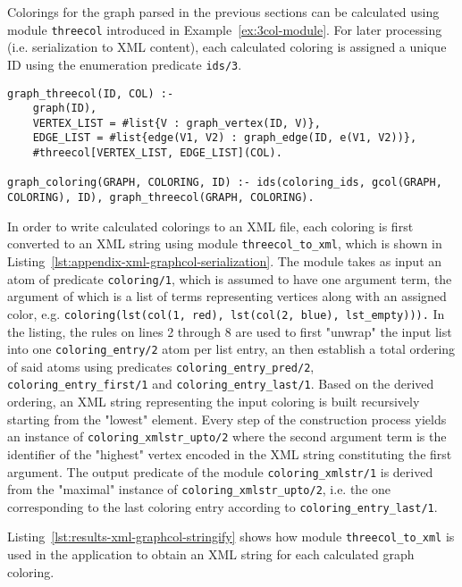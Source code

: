 Colorings for the graph parsed in the previous sections can be calculated using module \texttt{threecol} introduced in Example~\ref{ex:3col-module}. For later processing (i.e. serialization to XML content), each calculated coloring is assigned a unique ID using the enumeration predicate \texttt{ids/3}.

\begin{lstlisting}[style=asp-code, label={lst:results-xml-graphcol-colorings}, caption={Calculating graph colorings.}]
graph_threecol(ID, COL) :- 
	graph(ID), 
	VERTEX_LIST = #list{V : graph_vertex(ID, V)}, 
	EDGE_LIST = #list{edge(V1, V2) : graph_edge(ID, e(V1, V2))}, 
	#threecol[VERTEX_LIST, EDGE_LIST](COL).

graph_coloring(GRAPH, COLORING, ID) :- ids(coloring_ids, gcol(GRAPH, COLORING), ID), graph_threecol(GRAPH, COLORING).    
\end{lstlisting}    

In order to write calculated colorings to an XML file, each coloring is first converted to an XML string using module \texttt{threecol\_to\_xml}, which is shown in Listing~\ref{lst:appendix-xml-graphcol-serialization}. The module takes as input an atom of predicate \texttt{coloring/1}, which is assumed to have one argument term,  the argument of which is a list of terms representing vertices along with an assigned color, e.g. \texttt{coloring(lst(col(1, red), lst(col(2, blue), lst\_empty))).}
In the listing, the rules on lines 2 through 8 are used to first "unwrap" the input list into one \texttt{coloring\_entry/2} atom per list entry, an then establish a total ordering of said atoms using predicates \texttt{coloring\_entry\_pred/2}, \texttt{coloring\_entry\_first/1} and \texttt{coloring\_entry\_last/1}. Based on the derived ordering, an XML string representing the input coloring is built recursively starting from the "lowest" element. Every step of the construction process yields an instance of \texttt{coloring\_xmlstr\_upto/2} where the second argument term is the identifier of the "highest" vertex encoded in the XML string constituting the first argument. The output predicate of the module \texttt{coloring\_xmlstr/1} is derived from the "maximal" instance of \texttt{coloring\_xmlstr\_upto/2}, i.e. the one corresponding to the last coloring entry according to \texttt{coloring\_entry\_last/1}.

Listing~\ref{lst:results-xml-graphcol-stringify} shows how module \texttt{threecol\_to\_xml} is used in the application to obtain an XML string for each calculated graph coloring.

